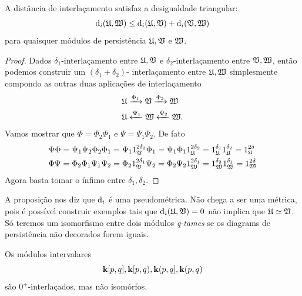 \begin{propo}\label{teo:inter_triang}
    A distância de interlaçamento satisfaz a desigualdade triangular:
    \begin{equation*}
        \text{d}_i(\mathfrak{U}, \mathfrak{W}) \leq \text{d}_i(\mathfrak{U}, \mathfrak{V}) + \text{d}_i(\mathfrak{V}, \mathfrak{W})
    \end{equation*}
    para quaisquer módulos de persistência $\mathfrak{U}, \mathfrak{V}$ e $\mathfrak{W}$. 
\end{propo}
\begin{proof}
    Dados $\delta_1$-interlaçamento entre $\mathfrak{U}, \mathfrak{V}$ e $\delta_2$-interlaçamento
    entre $\mathfrak{V}, \mathfrak{W}$, então podemos construir um $(\delta_1 + \delta_2)$-
    interlaçamento entre $\mathfrak{U}, \mathfrak{W}$ simplesmente compondo as outras duas aplicações
    de interlaçamento
    \begin{align*}
        &\mathfrak{U} \xrightarrow{\Phi_1} \mathfrak{V} \xrightarrow{\Phi_2} \mathfrak{W} \\
        &\mathfrak{U} \xleftarrow{\Psi_1} \mathfrak{W} \xleftarrow{\Psi_2} \mathfrak{W}.
    \end{align*}
    Vamos mostrar que $\Phi = \Phi_2 \Phi_1$ e $\Psi = \Psi_1 \Psi_2$. De fato
    \begin{align*}
        & \Psi\Phi = \Psi_1\Psi_2\Phi_2\Phi_1 = \Psi_1 1^{2\delta_2}_{\mathfrak{V}} \Phi_1 
        = \Psi_1\Phi_1 1^{2\delta_2}_{\mathfrak{U}} = 1^{\delta_1}_{\mathfrak{U}} 1^{\delta_2}_{\mathfrak{U}}
        = 1^{2\delta}_{\mathfrak{U}} \\
        & \Phi\Psi = \Phi_2\Phi_1\Psi_1\Psi_2 = \Phi_2 1^{2\delta_1}_{\mathfrak{V}} \Psi_2 
        = \Phi_2\Psi_2 1^{2\delta_1}_{\mathfrak{W}} = 1^{\delta_2}_{\mathfrak{W}} 1^{\delta_1}_{\mathfrak{W}}
        = 1^{2\delta}_{\mathfrak{W}} 
    \end{align*}
    Agora basta tomar o ínfimo entre $\delta_1, \delta_2$.
\end{proof}

A proposição nos diz que $\text{d}_i$ é uma pseudométrica. Não chega a ser uma métrica, 
pois é possível construir exemplos tais que $\text{d}_i(\mathfrak{U}, \mathfrak{V}) = 0$ não implica
que $\mathfrak{U} \simeq \mathfrak{V}$. Só teremos um isomorfismo entre dois módulos \textit{q-tames}
se os diagrams de persistência não decorados forem iguais. 

\begin{ex}
    Os módulos intervalares
    \begin{equation*}
        \mathbf{k}[p,q], \mathbf{k}[p,q), \mathbf{k}(p,q], \mathbf{k}(p,q)
    \end{equation*}
    são $0^+$-interlaçados, mas não isomórfos. 
\end{ex}

